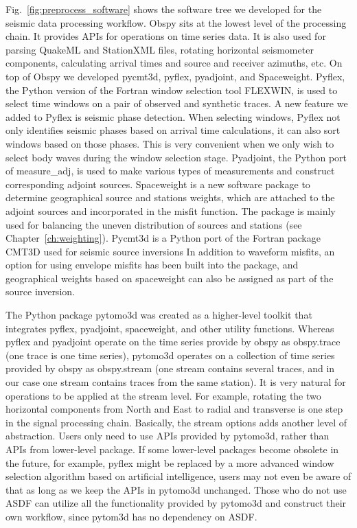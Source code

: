 Fig.~\ref{fig:preprocess_software} shows the software tree we developed
for the seismic data processing workflow.
Obspy sits at the lowest level of the processing chain.
It provides APIs for operations on time series data. It is also used for
parsing QuakeML and StationXML files, rotating horizontal seismometer components, calculating arrival times and source and receiver azimuths, etc.
On top of Obspy we developed pycmt3d, pyflex, pyadjoint, and Spaceweight.
Pyflex, the Python version of the Fortran window selection tool FLEXWIN, is used to select time windows on a pair of observed
and synthetic traces.
A new feature we added to Pyflex is seismic
phase detection.
When selecting windows, Pyflex not only identifies seismic phases
based on arrival time calculations, it can also sort windows based on those phases.
This is very convenient when we only wish to select body waves during the window selection stage.
Pyadjoint, the Python port of measure\_adj, is used to make
various types of measurements and construct corresponding adjoint sources.
Spaceweight is a new software package to determine geographical source and stations weights,
which are attached to the adjoint sources and incorporated in the misfit function.
The package is mainly used for
balancing the uneven distribution of sources and stations (see Chapter~\ref{ch:weighting}).
Pycmt3d is a Python port of the Fortran package CMT3D used for seismic source inversions
In addition
to waveform misfits, an option for using envelope misfits has been built into the package,
and geographical weights based on spaceweight can also be assigned as part of the source inversion.

The Python package pytomo3d was created as a higher-level toolkit that integrates
pyflex, pyadjoint, spaceweight, and other utility functions.
Whereas pyflex and pyadjoint operate on the time series provide by obspy as
obspy.trace (one trace is one time series),
pytomo3d operates on a collection of time series provided by obspy as obspy.stream (one stream contains several traces, and in our case one stream
contains traces from the same station).
It is very natural for operations to be
applied at the stream level.
For example, rotating the two horizontal components 
from North and East to radial and transverse is one step in the signal processing
chain.
Basically, the stream options adds another level of abstraction.
Users only need to use APIs provided by pytomo3d,
rather than APIs from lower-level package.
If some lower-level packages become obsolete in the future, for example, pyflex might be
replaced by a more advanced window selection algorithm based on artificial intelligence,
users may not even be aware of that as long as we keep the APIs in pytomo3d unchanged. 
Those who do not use ASDF can utilize all the functionality provided by
pytomo3d and construct their own workflow, since pytom3d has no dependency on ASDF.

